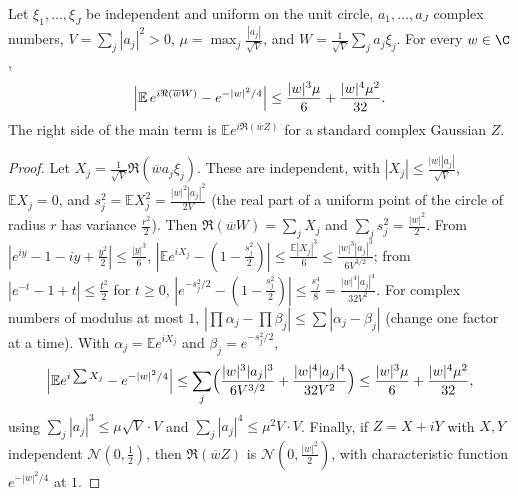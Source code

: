 \begin{lemma}\label{lem:circleclt}
Let $\xi_1,\dots,\xi_J$ be independent and uniform on the unit circle, $a_1,\dots,a_J$ complex numbers, $V=\sum_j|a_j|^2>0$, $\mu=\max_j\frac{|a_j|}{\sqrt V}$, and $W=\frac1{\sqrt V}\sum_ja_j\xi_j$. For every $w\in\C$,
\[
\Bigl|\mathbb E\,e^{i\Re(\overline wW)}-e^{-|w|^2/4}\Bigr|\le\frac{|w|^3\mu}6+\frac{|w|^4\mu^2}{32}.
\]
The right side of the main term is $\mathbb Ee^{i\Re(\overline wZ)}$ for a standard complex Gaussian $Z$.
\end{lemma}
\begin{proof}
Let $X_j=\frac1{\sqrt V}\Re(\overline wa_j\xi_j)$. These are independent, with $|X_j|\le\frac{|w||a_j|}{\sqrt V}$, $\mathbb EX_j=0$, and $s_j^2=\mathbb EX_j^2=\frac{|w|^2|a_j|^2}{2V}$ (the real part of a uniform point of the circle of radius $r$ has variance $\frac{r^2}2$). Then $\Re(\overline wW)=\sum_jX_j$ and $\sum_js_j^2=\frac{|w|^2}2$. From $|e^{iy}-1-iy+\frac{y^2}2|\le\frac{|y|^3}6$, $|\mathbb Ee^{iX_j}-(1-\frac{s_j^2}2)|\le\frac{\mathbb E|X_j|^3}6\le\frac{|w|^3|a_j|^3}{6V^{3/2}}$; from $|e^{-t}-1+t|\le\frac{t^2}2$ for $t\ge0$, $|e^{-s_j^2/2}-(1-\frac{s_j^2}2)|\le\frac{s_j^4}8=\frac{|w|^4|a_j|^4}{32V^2}$. For complex numbers of modulus at most $1$, $|\prod\alpha_j-\prod\beta_j|\le\sum|\alpha_j-\beta_j|$ (change one factor at a time). With $\alpha_j=\mathbb Ee^{iX_j}$ and $\beta_j=e^{-s_j^2/2}$,
\[
\Bigl|\mathbb Ee^{i\sum X_j}-e^{-|w|^2/4}\Bigr|\le\sum_j\Bigl(\frac{|w|^3|a_j|^3}{6V^{3/2}}+\frac{|w|^4|a_j|^4}{32V^2}\Bigr)\le\frac{|w|^3\mu}6+\frac{|w|^4\mu^2}{32},
\]
using $\sum_j|a_j|^3\le\mu\sqrt V\cdot V$ and $\sum_j|a_j|^4\le\mu^2V\cdot V$. Finally, if $Z=X+iY$ with $X,Y$ independent $\mathcal N(0,\frac12)$, then $\Re(\overline wZ)$ is $\mathcal N(0,\frac{|w|^2}2)$, with characteristic function $e^{-|w|^2/4}$ at $1$.
\end{proof}

